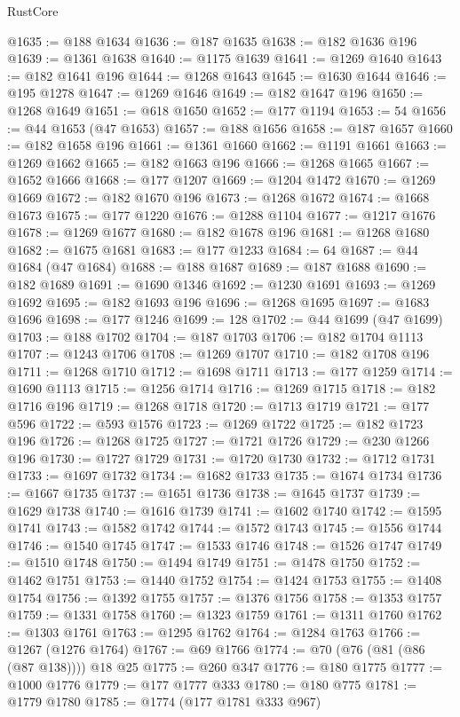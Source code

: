 \begin{lexlean}{RustCore}
\begin{coremodule}
@1635 := @188 @1634
@1636 := @187 @1635
@1638 := @182 @1636 @196
@1639 := @1361 @1638
@1640 := @1175 @1639
@1641 := @1269 @1640
@1643 := @182 @1641 @196
@1644 := @1268 @1643
@1645 := @1630 @1644
@1646 := @195 @1278
@1647 := @1269 @1646
@1649 := @182 @1647 @196
@1650 := @1268 @1649
@1651 := @618 @1650
@1652 := @177 @1194
@1653 := 54
@1656 := @44 @1653 (@47 @1653)
@1657 := @188 @1656
@1658 := @187 @1657
@1660 := @182 @1658 @196
@1661 := @1361 @1660
@1662 := @1191 @1661
@1663 := @1269 @1662
@1665 := @182 @1663 @196
@1666 := @1268 @1665
@1667 := @1652 @1666
@1668 := @177 @1207
@1669 := @1204 @1472
@1670 := @1269 @1669
@1672 := @182 @1670 @196
@1673 := @1268 @1672
@1674 := @1668 @1673
@1675 := @177 @1220
@1676 := @1288 @1104
@1677 := @1217 @1676
@1678 := @1269 @1677
@1680 := @182 @1678 @196
@1681 := @1268 @1680
@1682 := @1675 @1681
@1683 := @177 @1233
@1684 := 64
@1687 := @44 @1684 (@47 @1684)
@1688 := @188 @1687
@1689 := @187 @1688
@1690 := @182 @1689
@1691 := @1690 @1346
@1692 := @1230 @1691
@1693 := @1269 @1692
@1695 := @182 @1693 @196
@1696 := @1268 @1695
@1697 := @1683 @1696
@1698 := @177 @1246
@1699 := 128
@1702 := @44 @1699 (@47 @1699)
@1703 := @188 @1702
@1704 := @187 @1703
@1706 := @182 @1704 @1113
@1707 := @1243 @1706
@1708 := @1269 @1707
@1710 := @182 @1708 @196
@1711 := @1268 @1710
@1712 := @1698 @1711
@1713 := @177 @1259
@1714 := @1690 @1113
@1715 := @1256 @1714
@1716 := @1269 @1715
@1718 := @182 @1716 @196
@1719 := @1268 @1718
@1720 := @1713 @1719
@1721 := @177 @596
@1722 := @593 @1576
@1723 := @1269 @1722
@1725 := @182 @1723 @196
@1726 := @1268 @1725
@1727 := @1721 @1726
@1729 := @230 @1266 @196
@1730 := @1727 @1729
@1731 := @1720 @1730
@1732 := @1712 @1731
@1733 := @1697 @1732
@1734 := @1682 @1733
@1735 := @1674 @1734
@1736 := @1667 @1735
@1737 := @1651 @1736
@1738 := @1645 @1737
@1739 := @1629 @1738
@1740 := @1616 @1739
@1741 := @1602 @1740
@1742 := @1595 @1741
@1743 := @1582 @1742
@1744 := @1572 @1743
@1745 := @1556 @1744
@1746 := @1540 @1745
@1747 := @1533 @1746
@1748 := @1526 @1747
@1749 := @1510 @1748
@1750 := @1494 @1749
@1751 := @1478 @1750
@1752 := @1462 @1751
@1753 := @1440 @1752
@1754 := @1424 @1753
@1755 := @1408 @1754
@1756 := @1392 @1755
@1757 := @1376 @1756
@1758 := @1353 @1757
@1759 := @1331 @1758
@1760 := @1323 @1759
@1761 := @1311 @1760
@1762 := @1303 @1761
@1763 := @1295 @1762
@1764 := @1284 @1763
@1766 := @1267 (@1276 @1764)
@1767 := @69 @1766
@1774 := @70 (@76 (@81 (@86 (@87 @138)))) @18 @25
@1775 := @260 @347
@1776 := @180 @1775
@1777 := @1000 @1776
@1779 := @177 @1777 @333
@1780 := @180 @775
@1781 := @1779 @1780
@1785 := @1774 (@177 @1781 @333 @967)

\end{coremodule}
\end{lexlean}
